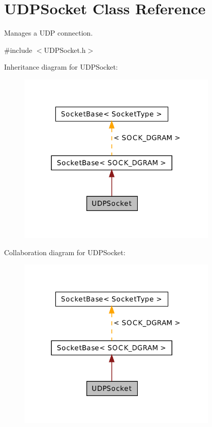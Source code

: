 \hypertarget{class_u_d_p_socket}{\section{U\-D\-P\-Socket Class Reference}
\label{class_u_d_p_socket}
}


Manages a U\-D\-P connection.  




{\ttfamily \#include $<$U\-D\-P\-Socket.\-h$>$}



Inheritance diagram for U\-D\-P\-Socket\-:\nopagebreak
\begin{figure}[H]
\begin{center}
\leavevmode
\includegraphics[width=271pt]{class_u_d_p_socket__inherit__graph}
\end{center}
\end{figure}


Collaboration diagram for U\-D\-P\-Socket\-:\nopagebreak
\begin{figure}[H]
\begin{center}
\leavevmode
\includegraphics[width=271pt]{class_u_d_p_socket__coll__graph}
\end{center}
\end{figure}
